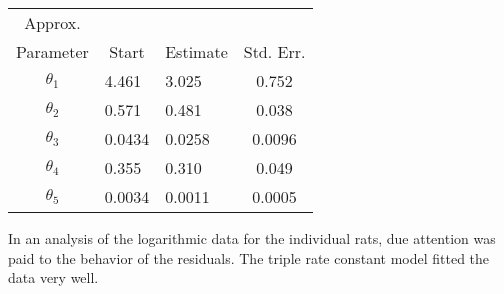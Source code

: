 \begin{example}
\begin{table}
\begin{center}
\begin{tabular}{cllc}
      \multicolumn{1}{c}{Approx.}\\ \multicolumn{1}{c}{Parameter} &
      \multicolumn{1}{c}{Start} & \multicolumn{1}{c}{Estimate} &
      \multicolumn{1}{c}{Std. Err.}\\ \hline
      $\theta_{1}$&4.461&3.025&0.752\\ $\theta_{2}$&0.571&0.481&0.038\\
      $\theta_{3}$&0.0434&0.0258&0.0096\\ $\theta_{4}$&0.355&0.310&0.049\\
      $\theta_{5}$&0.0034&0.0011&0.0005\\ \hline
    \end{tabular}
  \end{center}
\end{table}


In an analysis of the logarithmic data for the individual rats, due
attention was paid to the behavior of the residuals.
The triple rate constant model fitted the data very well.
\end{example}

